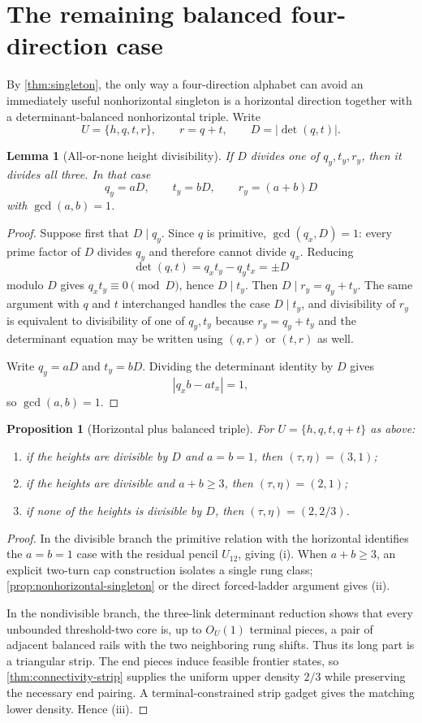 \documentclass[11pt]{article}
\newtheorem{proposition}[theorem]{Proposition}
\newtheorem{lemma}[theorem]{Lemma}
\theoremstyle{definition}
\begin{document}
\section{The remaining balanced four-direction case}\label{sec:balanced-four}
By \cref{thm:singleton}, the only way a four-direction alphabet can avoid an immediately useful nonhorizontal singleton is a horizontal direction together with a determinant-balanced nonhorizontal triple.  Write
\[
U=\{h,q,t,r\},\qquad r=q+t,\qquad D=|\det(q,t)|.
\]

\begin{lemma}[All-or-none height divisibility]\label{lem:divisibility}
If $D$ divides one of $q_y,t_y,r_y$, then it divides all three.  In that case
\[
q_y=aD,\qquad t_y=bD,\qquad r_y=(a+b)D
\]
with $\gcd(a,b)=1$.
\end{lemma}
\begin{proof}
Suppose first that $D\mid q_y$.  Since $q$ is primitive, $\gcd(q_x,D)=1$: every prime factor of $D$ divides $q_y$ and therefore cannot divide $q_x$.  Reducing
\[
\det(q,t)=q_xt_y-q_yt_x=\pm D
\]
modulo $D$ gives $q_xt_y\equiv0\pmod D$, hence $D\mid t_y$.  Then $D\mid r_y=q_y+t_y$.  The same argument with $q$ and $t$ interchanged handles the case $D\mid t_y$, and divisibility of $r_y$ is equivalent to divisibility of one of $q_y,t_y$ because $r_y=q_y+t_y$ and the determinant equation may be written using $(q,r)$ or $(t,r)$ as well.

Write $q_y=aD$ and $t_y=bD$.  Dividing the determinant identity by $D$ gives
\[
|q_xb-a t_x|=1,
\]
so $\gcd(a,b)=1$.
\end{proof}

\begin{proposition}[Horizontal plus balanced triple]\label{prop:h-balanced}
For $U=\{h,q,t,q+t\}$ as above:
\begin{enumerate}[label=(\roman*)]
\item if the heights are divisible by $D$ and $a=b=1$, then $(\tau,\eta)=(3,1)$;
\item if the heights are divisible and $a+b\ge3$, then $(\tau,\eta)=(2,1)$;
\item if none of the heights is divisible by $D$, then $(\tau,\eta)=(2,2/3)$.
\end{enumerate}
\end{proposition}
\begin{proof}
In the divisible branch the primitive relation with the horizontal identifies the $a=b=1$ case with the residual pencil $U_{12}$, giving (i).  When $a+b\ge3$, an explicit two-turn cap construction isolates a single rung class; \cref{prop:nonhorizontal-singleton} or the direct forced-ladder argument gives (ii).

In the nondivisible branch, the three-link determinant reduction shows that every unbounded threshold-two core is, up to $O_U(1)$ terminal pieces, a pair of adjacent balanced rails with the two neighboring rung shifts.  Thus its long part is a triangular strip.  The end pieces induce feasible frontier states, so \cref{thm:connectivity-strip} supplies the uniform upper density $2/3$ while preserving the necessary end pairing.  A terminal-constrained strip gadget gives the matching lower density.  Hence (iii).
\end{proof}
\end{document}
